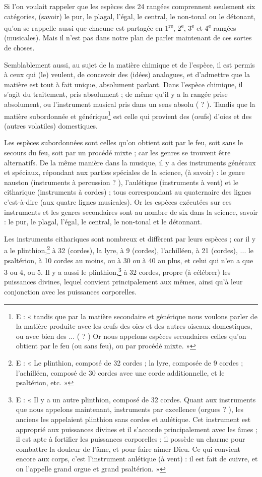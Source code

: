 \documentclass[a4paper, 11pt, oneside, polutonikogreek, french]{article}
\begin{document}
Si l'on voulait rappeler que les espèces des 24 rangées comprennent seulement six catégories, (savoir) le pur, le plagal, l'égal, le central, le non-tonal ou le détonant, qu'on se rappelle aussi que chacune est partagée en 1\textsuperscript{re}, 2\textsuperscript{e}, 3\textsuperscript{e} et 4\textsuperscript{e} rangées (musicales). Mais il n'est pas dans notre plan de parler maintenant de ces sortes de choses.

Semblablement aussi, au sujet de la matière chimique et de l'espèce, il est permis à ceux qui (le) veulent, de concevoir des (idées) analogues, et d'admettre que la matière est tout à fait unique, absolument parlant. Dans l'espèce chimique, il s'agit du traitement, pris absolument ; de même qu'il y a la rangée prise absolument, ou l'instrument musical pris dans un sens absolu ( ? ). Tandis que la matière subordonnée et générique\footnote{E : « tandis que par la matière secondaire et générique nous voulons parler de la matière produite avec les œufs des oies et des autres oiseaux domestiques, ou avec bien des ... ( ? ) Or nous appelons espèces secondaires celles qu'on obtient par le feu (ou sans feu), ou par procédé mixte. »} est celle qui provient des (œufs) d'oies et des (autres volatiles) domestiques.

Les espèces subordonnées sont celles qu'on obtient soit par le feu, soit sans le secours du feu, soit par un procédé mixte ; car les genres se trouvent être alternatifs. De la même manière dans la musique, il y a des instruments généraux et spéciaux, répondant aux parties spéciales de la science, (à savoir) : le genre nauston (instruments à percussion ? ), l'aulétique (instruments à vent) et le citharique (instruments à cordes) ; tous correspondant au quaternaire des lignes c'est-à-dire (aux quatre lignes musicales). Or les espèces exécutées sur ces instruments et les genres secondaires sont au nombre de six dans la science, savoir : le pur, le plagal, l'égal, le central, le non-tonal et le détonnant.

Les instruments cithariques sont nombreux et diffèrent par leurs espèces ; car il y a le plinthion,\footnote{E : « Le plinthion, composé de 32 cordes ; la lyre, composée de 9 cordes ; l'achilléen, composé de 30 cordes avec une corde additionnelle, et le psaltérion, etc. »} à 32 (cordes), la lyre, à 9 (cordes), l'achilléen, à 21 (cordes), ... le psaltérion, à 10 cordes au moins, ou à 30 ou à 40 au plus, et celui qui n'en a que 3 ou 4, ou 5. Il y a aussi le plinthion,\footnote{E : « Il y a un autre plinthion, composé de 32 cordes. Quant aux instruments que nous appelons maintenant, instruments par excellence (orgues ? ), les anciens les appelaient plinthion sans cordes et aulétique. Cet instrument est approprié aux puissances divines et il s'accorde principalement avec les âmes ; il est apte à fortifier les puissances corporelles ; il possède un charme pour combattre la douleur de l'âme, et pour faire aimer Dieu. Ce qui convient encore aux corps, c'est l'instrument aulétique (à vent) : il est fait de cuivre, et on l'appelle grand orgue et grand psaltérion. »} à 32 cordes, propre (à célébrer) les puissances divines, lequel convient principalement aux mêmes, ainsi qu'à leur conjonction avec les puissances corporelles.
\end{document}
